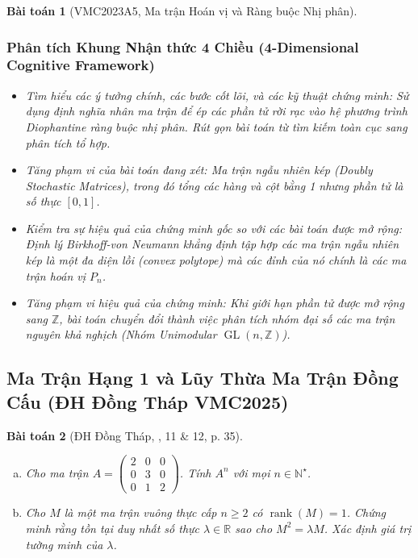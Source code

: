 \documentclass{article}
\newtheorem{baitoan}{Bài toán}
\begin{document}
\begin{baitoan}[VMC2023A5, Ma trận Hoán vị và Ràng buộc Nhị phân]
 \subsubsection*{Phân tích Khung Nhận thức 4 Chiều (4-Dimensional Cognitive Framework)}
 \begin{itemize}
 \item \textit{Tìm hiểu các ý tưởng chính, các bước cốt lõi, và các kỹ thuật chứng minh}: Sử dụng định nghĩa nhân ma trận để ép các phần tử rời rạc vào hệ phương trình Diophantine ràng buộc nhị phân. Rút gọn bài toán từ tìm kiếm toàn cục sang phân tích tổ hợp.
 \item \textit{Tăng phạm vi của bài toán đang xét}: Ma trận ngẫu nhiên kép (Doubly Stochastic Matrices), trong đó tổng các hàng và cột bằng 1 nhưng phần tử là số thực $[0, 1]$.
 \item \textit{Kiểm tra sự hiệu quả của chứng minh gốc so với các bài toán được mở rộng}: Định lý Birkhoff-von Neumann khẳng định tập hợp các ma trận ngẫu nhiên kép là một đa diện lồi (convex polytope) mà các đỉnh của nó chính là các ma trận hoán vị $P_n$.
 \item \textit{Tăng phạm vi hiệu quả của chứng minh}: Khi giới hạn phần tử được mở rộng sang $\mathbb{Z}$, bài toán chuyển đổi thành việc phân tích nhóm đại số các ma trận nguyên khả nghịch (Nhóm Unimodular $\operatorname{GL}(n, \mathbb{Z})$).
 \end{itemize}
\end{baitoan}




\subsection{Ma Trận Hạng 1 và Lũy Thừa Ma Trận Đồng Cấu (ĐH Đồng Tháp VMC2025)}

\begin{baitoan}[ĐH Đồng Tháp, \cite{VMS_VMC2025}, 11 \& 12, p. 35]
	\begin{enumerate}[(a)]
		\item Cho ma trận $A = \begin{pmatrix} 2 & 0 & 0 \\ 0 & 3 & 0 \\ 0 & 1 & 2 \end{pmatrix}$. Tính $A^n$ với mọi $n \in \mathbb{N}^\star$.
		\item Cho $M$ là một ma trận vuông thực cấp $n \ge 2$ có $\operatorname{rank}(M) = 1$. Chứng minh rằng tồn tại duy nhất số thực $\lambda \in \mathbb{R}$ sao cho $M^2 = \lambda M$. Xác định giá trị tường minh của $\lambda$.
	\end{enumerate}
\end{baitoan}
\end{document}
